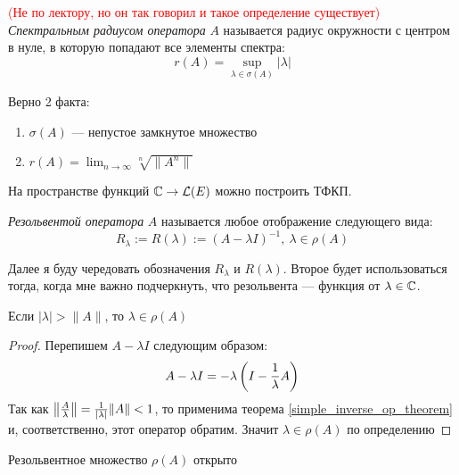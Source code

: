 \begin{definition} \textcolor{red}{(Не по лектору, но он так говорил и такое определение существует)}
	\textit{Спектральным радиусом оператора} $A$ называется радиус окружности с центром в нуле, в которую попадают все элементы спектра:
	\[
		r(A) = \sup_{\lambda \in \sigma(A)} |\lambda|
	\]
\end{definition}


\begin{theorem}
	Верно 2 факта:
	\begin{enumerate}
		\item $\sigma(A)$ --- непустое замкнутое множество
		
		\item $r(A) = \lim_{n \to \infty} \sqrt[n]{\|A^n\|}$
	\end{enumerate}
\end{theorem}

\begin{proposition}
	На пространстве функций $\mathbb{C} \to \mathcal{L}(E)$ можно построить ТФКП.
\end{proposition}

\begin{definition}
	\textit{Резольвентой оператора} $A$ называется любое отображение следующего вида:
	\[
		R_\lambda := R(\lambda) := (A - \lambda I)^{-1},\ \lambda \in \rho(A)
	\]
\end{definition}

\begin{anote}
	Далее я буду чередовать обозначения $R_\lambda$ и $R(\lambda)$. Второе будет использоваться тогда, когда мне важно подчеркнуть, что резольвента --- функция от $\lambda \in \mathbb{C}$.
\end{anote}

\begin{proposition} \label{prop10_for_radius}
	Если $|\lambda| > \|A\|$, то $\lambda \in \rho(A)$
\end{proposition}

\begin{proof}
	Перепишем $A - \lambda I$ следующим образом:
	\[
		A - \lambda I = -\lambda\left(I - \frac{1}{\lambda}A\right)
	\]
	Так как $\left\|\frac{A}{\lambda}\right\| = \frac{1}{|\lambda|}\|A\| < 1$, то применима теорема \ref{simple_inverse_op_theorem} и, соответственно, этот оператор обратим. Значит $\lambda \in \rho(A)$ по определению
\end{proof}

\begin{proposition}
	Резольвентное множество $\rho(A)$ открыто
\end{proposition}


